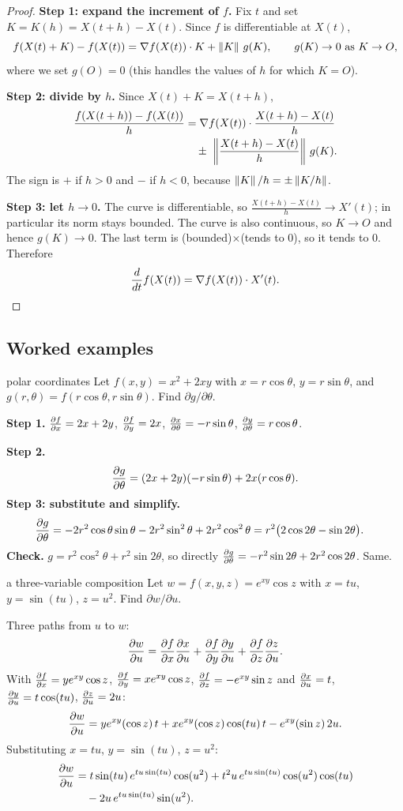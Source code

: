 \begin{proof}
\textbf{Step 1: expand the increment of $f$.} Fix $t$ and set $K=K(h)=X(t+h)-X(t)$.
Since $f$ is differentiable at $X(t)$,
\[ f(X(t)+K)-f(X(t))=\nabla f(X(t))\cdot K+\left\lVert K\right\rVert\,g(K),\qquad g(K)\to0\text{ as }K\to O, \]
where we set $g(O)=0$ (this handles the values of $h$ for which $K=O$).

\textbf{Step 2: divide by $h$.} Since $X(t)+K=X(t+h)$,
\begin{align*}
\frac{f(X(t+h))-f(X(t))}{h}&=\nabla f(X(t))\cdot\frac{X(t+h)-X(t)}{h}\\
&\quad\pm\ \left\lVert \frac{X(t+h)-X(t)}{h}\right\rVert\,g(K).
\end{align*}
The sign is $+$ if $h>0$ and $-$ if $h<0$, because $\left\lVert K\right\rVert/h=\pm\left\lVert K/h\right\rVert$.

\textbf{Step 3: let $h\to0$.} The curve is differentiable, so
$\frac{X(t+h)-X(t)}{h}\to X'(t)$; in particular its norm stays bounded. The curve is
also continuous, so $K\to O$ and hence $g(K)\to0$. The last term is (bounded)$\times$(tends
to $0$), so it tends to $0$. Therefore
\[ \frac{d}{dt}f(X(t))=\nabla f(X(t))\cdot X'(t). \]
\end{proof}

\subsection{Worked examples}

\begin{example}{polar coordinates}
Let $f(x,y)=x^2+2xy$ with $x=r\cos\theta$, $y=r\sin\theta$, and $g(r,\theta)=f(r\cos\theta,r\sin\theta)$.
Find $\partial g/\partial\theta$.

\textbf{Step 1.} $\frac{\partial f}{\partial x}=2x+2y$, $\frac{\partial f}{\partial y}=2x$, $\frac{\partial x}{\partial \theta}=-r\sin\theta$, $\frac{\partial y}{\partial \theta}=r\cos\theta$.

\textbf{Step 2.}
\[ \frac{\partial g}{\partial \theta}=(2x+2y)(-r\sin\theta)+2x(r\cos\theta). \]
\textbf{Step 3: substitute and simplify.}
\begin{align*}
\frac{\partial g}{\partial \theta}&=-2r^2\cos\theta\sin\theta-2r^2\sin^2\theta+2r^2\cos^2\theta
 = r^2\big(2\cos2\theta-\sin2\theta\big).
\end{align*}
\textbf{Check.} $g=r^2\cos^2\theta+r^2\sin2\theta$, so directly
$\frac{\partial g}{\partial \theta}=-r^2\sin2\theta+2r^2\cos2\theta$. Same.
\end{example}

\begin{example}{a three-variable composition}
Let $w=f(x,y,z)=e^{xy}\cos z$ with $x=tu$, $y=\sin(tu)$, $z=u^2$. Find $\partial w/\partial u$.

Three paths from $u$ to $w$:
\[ \frac{\partial w}{\partial u}=\frac{\partial f}{\partial x}\frac{\partial x}{\partial u}+\frac{\partial f}{\partial y}\frac{\partial y}{\partial u}+\frac{\partial f}{\partial z}\frac{\partial z}{\partial u} . \]
With $\frac{\partial f}{\partial x}=ye^{xy}\cos z$, $\frac{\partial f}{\partial y}=xe^{xy}\cos z$, $\frac{\partial f}{\partial z}=-e^{xy}\sin z$ and
$\frac{\partial x}{\partial u}=t$, $\frac{\partial y}{\partial u}=t\cos(tu)$, $\frac{\partial z}{\partial u}=2u$:
\[
\frac{\partial w}{\partial u}=ye^{xy}(\cos z)\,t+xe^{xy}(\cos z)\cos(tu)\,t-e^{xy}(\sin z)\,2u .
\]
Substituting $x=tu$, $y=\sin(tu)$, $z=u^2$:
\begin{align*}
\frac{\partial w}{\partial u}&=t\sin(tu)\,e^{tu\sin(tu)}\cos(u^2)+t^2u\,e^{tu\sin(tu)}\cos(u^2)\cos(tu)\\
&\quad-2u\,e^{tu\sin(tu)}\sin(u^2).
\end{align*}
\end{example}


